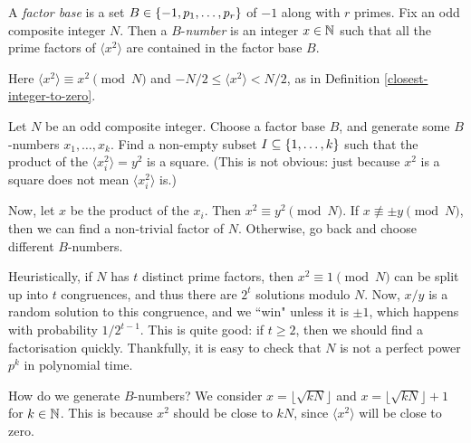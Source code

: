 \documentclass{article}
\begin{document}
\begin{definition}
    A \textit{factor base} is a set $B \in \left\lbrace -1, p_1, \dots, p_r \right\rbrace$ of $-1$ along with $r$ primes. Fix an odd composite integer $N$. Then a $B$-\textit{number} is an integer $x \in \mathbb{N}$ such that all the prime factors of $\langle x^2 \rangle$ are contained in the factor base $B$.
    
    Here $\langle x^2 \rangle \equiv x^2 \pmod N$ and $-N/2 \leq \langle x^2 \rangle < N/2$, as in Definition \ref{closest-integer-to-zero}.
\end{definition}

\begin{definition}
    Let $N$ be an odd composite integer. Choose a factor base $B$, and generate some $B$-numbers $x_1, \dots, x_k$. Find a non-empty subset $I \subseteq \left\lbrace 1, \dots, k \right\rbrace$ such that the product of the $\langle x_i^2 \rangle = y^2$ is a square. (This is not obvious: just because $x^2$ is a square does not mean $\langle x_i^2 \rangle$ is.)
    
    Now, let $x$ be the product of the $x_i$. Then $x^2 \equiv y^2 \pmod N$. If $x \not\equiv \pm y \pmod N$, then we can find a non-trivial factor of $N$. Otherwise, go back and choose different $B$-numbers.
\end{definition}

\begin{note}
	Heuristically, if $N$ has $t$ distinct prime factors, then $x^2 \equiv 1 \pmod N$ can be split up into $t$ congruences, and thus there are $2^t$ solutions modulo $N$. Now, $x/y$ is a random solution to this congruence, and we ``win" unless it is $\pm 1$, which happens with probability $1/2^{t-1}$. This is quite good: if $t \geq 2$, then we should find  a factorisation quickly. Thankfully, it is easy to check that $N$ is not a perfect power $p^k$ in polynomial time.
\end{note}

How do we generate $B$-numbers? We consider $x = \lfloor \sqrt{kN} \rfloor$ and $x = \lfloor \sqrt{kN} \rfloor + 1$ for $k \in \mathbb{N}$. This is because $x^2$ should be close to $kN$, since $\langle x^2 \rangle$ will be close to zero.
\end{document}

